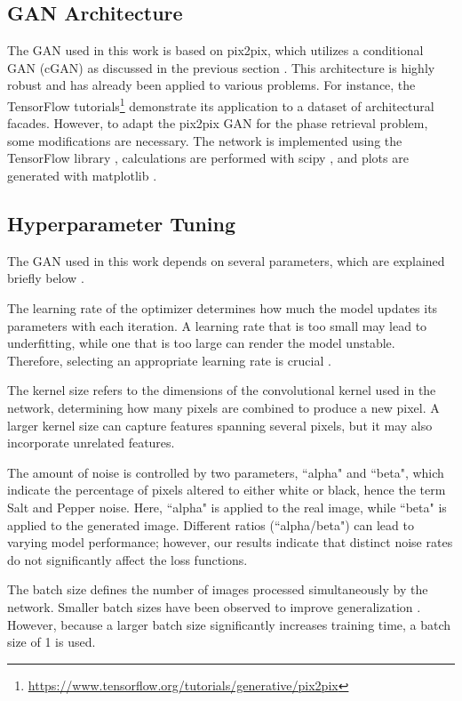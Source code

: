 \subsection{GAN Architecture}
The GAN used in this work is based on pix2pix, which utilizes a conditional GAN (cGAN) as discussed in the previous section \citep{isola2017image}. This architecture is highly robust and has already been applied to various problems. For instance, the TensorFlow tutorials\footnote{\url{https://www.tensorflow.org/tutorials/generative/pix2pix}} demonstrate its application to a dataset of architectural facades. However, to adapt the pix2pix GAN for the phase retrieval problem, some modifications are necessary. The network is implemented using the TensorFlow library \citep{abadi2016tensorflow}, calculations are performed with scipy \citep{virtanen2020scipy}, and plots are generated with matplotlib \citep{4160265}.

\subsection{Hyperparameter Tuning}
The GAN used in this work depends on several parameters, which are explained briefly below \citep[for a more in-depth discussion, see][]{murphy2022probabilistic}.

The learning rate of the optimizer determines how much the model updates its parameters with each iteration. A learning rate that is too small may lead to underfitting, while one that is too large can render the model unstable. Therefore, selecting an appropriate learning rate is crucial \citep{murphy2022probabilistic}. 

The kernel size refers to the dimensions of the convolutional kernel used in the network, determining how many pixels are combined to produce a new pixel. A larger kernel size can capture features spanning several pixels, but it may also incorporate unrelated features. 

The amount of noise is controlled by two parameters, ``alpha" and ``beta", which indicate the percentage of pixels altered to either white or black, hence the term Salt and Pepper noise. Here, ``alpha" is applied to the real image, while ``beta" is applied to the generated image. Different ratios (``alpha/beta") can lead to varying model performance; however, our results indicate that distinct noise rates do not significantly affect the loss functions. 

The batch size defines the number of images processed simultaneously by the network. Smaller batch sizes have been observed to improve generalization \citep{prince2023understanding}. However, because a larger batch size significantly increases training time, a batch size of 1 is used.

